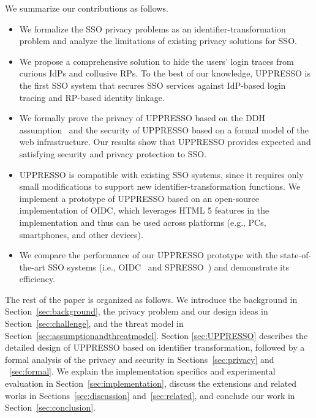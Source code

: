 We summarize our contributions as follows.
\begin{itemize}
\vspace{-\topsep}
\item We formalize the SSO privacy problems as an identifier-transformation problem and analyze the limitations of existing privacy solutions for SSO.
\vspace{-\topsep}
\item We propose a comprehensive solution to hide the users' login traces from curious IdPs and collusive RPs. To the best of our knowledge, UPPRESSO is the first SSO system that secures SSO services against IdP-based login tracing and RP-based identity linkage.
\vspace{-\topsep}
\item We formally prove the privacy of UPPRESSO based on the DDH assumption~\cite{GoldwasserK16} and the security of UPPRESSO based on a formal model of the web infrastructure. Our results show that UPPRESSO provides expected and satisfying security and privacy protection to SSO.
\vspace{-\topsep}
\item UPPRESSO is compatible with existing SSO systems, since it requires only small modifications to support new identifier-transformation functions. We implement a prototype of UPPRESSO based on an open-source implementation of OIDC, which leverages HTML 5 features in the implementation and thus can be used across platforms (e.g., PCs, smartphones, and other devices). %
\vspace{-\topsep}
\item We compare the performance of our UPPRESSO prototype with the state-of-the-art SSO systems (i.e., OIDC~\cite{OpenIDConnect} and SPRESSO~\cite{SPRESSO}) and demonstrate its efficiency.
\end{itemize}
\vspace{-\topsep}
The rest of the paper is organized as follows. We introduce the background in Section~\ref{sec:background}, the privacy problem and our design ideas in Section~\ref{sec:challenge}, and the threat model in Section~\ref{sec:assumptionandthreatmodel}. Section \ref{sec:UPPRESSO} describes the detailed design of UPPRESSO based on identifier transformation, followed by a formal analysis of the privacy and security in Sections~\ref{sec:privacy} and ~\ref{sec:formal}. We explain the implementation specifics and experimental evaluation in Section~\ref{sec:implementation}, discuss the extensions and related works in Sections~\ref{sec:discussion} and~\ref{sec:related}, and conclude our work in Section~\ref{sec:conclusion}.

